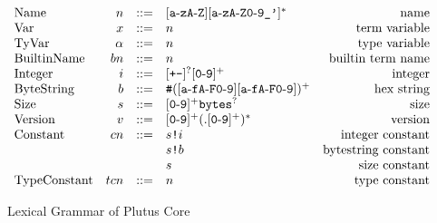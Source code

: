 \documentclass[../main.tex]{subfiles}
\begin{document}
\begin{figure*}[t]
    \centering
    \[\begin{array}{lrclr}

        \textrm{Name}        & n      & ::= & [\texttt{a}\!\hyphen{}\!\texttt{z}\texttt{A}\!\hyphen{}\!\texttt{Z}][\texttt{a}\!\hyphen{}\!\texttt{zA}\!\hyphen{}\!\texttt{Z0}\!\hyphen{}\!\texttt{9\_'}]^*   & \textrm{name}\\

        \textrm{Var}           & x      & ::= & n & \textrm{term variable}\\
        \textrm{TyVar}         & \alpha & ::= & n & \textrm{type variable}\\
        \textrm{BuiltinName}   & bn     & ::= & n & \textrm{builtin term name}\\
        \textrm{Integer} & i  & ::= & [\texttt{+-}]^?[\texttt{0}\!\hyphen{}\!\texttt{9}]^+ & \textrm{integer}\\

        \textrm{ByteString}   & b  & ::= & \texttt{\#}([\texttt{a}\!\hyphen{}\!\texttt{fA}\!\hyphen{}\!\texttt{F0}\!\hyphen{}\!\texttt{9}][\texttt{a}\!\hyphen{}\!\texttt{fA}\!\hyphen{}\!\texttt{F0}\!\hyphen{}\!\texttt{9}])^+ & \textrm{hex string}\\

        \textrm{Size} & s  & ::= & [\texttt{0}\!\hyphen{}\!\texttt{9}]^+ \texttt{bytes}^? & \textrm{size}\\

        \textrm{Version} & v & ::= & [\texttt{0}\!\hyphen{}\!\texttt{9}]^+(.[\texttt{0}\!\hyphen{}\!\texttt{9}]^+)^* & \textrm{version}\\

        \textrm{Constant} & cn & ::= & \sizedBuiltin{s}{i} & \textrm{integer constant}\\
                          &    &     & \sizedBuiltin{s}{b} & \textrm{bytestring constant}\\
                          &    &     & s & \textrm{size constant}\\
        \textrm{TypeConstant} & tcn    & ::= & n & \textrm{type constant}\\


    \end{array}\]
    \caption{Lexical Grammar of Plutus Core}
    \label{fig:Plutus_core_lexical_grammar}
\end{figure*}
\end{document}

